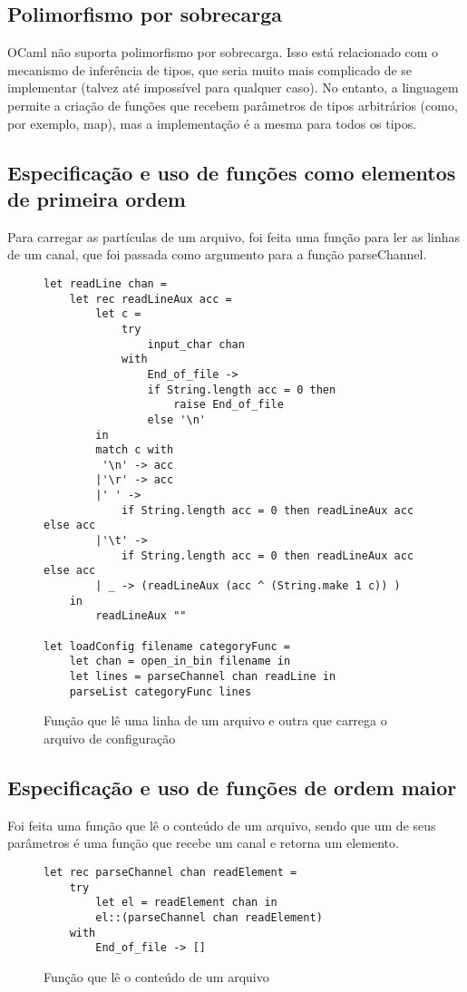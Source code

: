 \documentclass[a4paper,10pt]{article}
\begin{document}
\subsection{Polimorfismo por sobrecarga}
	
	OCaml não suporta polimorfismo por sobrecarga. Isso está relacionado com o mecanismo de inferência de tipos, que seria muito mais complicado de se implementar (talvez até impossível para qualquer caso). No entanto, a linguagem permite a criação de funções que recebem parâmetros de tipos arbitrários (como, por exemplo, map), mas a implementação é a mesma para todos os tipos.

\subsection{Especificação e uso de funções como elementos de primeira ordem}
	
	Para carregar as partículas de um arquivo, foi feita uma função para ler as linhas de um canal, que foi passada como argumento para a função parseChannel.
	
	\begin{figure}[H]
	\centering	
	\begin{lstlisting}
let readLine chan =
	let rec readLineAux acc =
		let c =
			try
				input_char chan
			with
				End_of_file ->
				if String.length acc = 0 then
					raise End_of_file
				else '\n'
		in
		match c with
		 '\n' -> acc
		|'\r' -> acc
		|' ' ->
			if String.length acc = 0 then readLineAux acc else acc
		|'\t' ->
			if String.length acc = 0 then readLineAux acc else acc
		| _ -> (readLineAux (acc ^ (String.make 1 c)) )
	in
		readLineAux ""
		
let loadConfig filename categoryFunc =
	let chan = open_in_bin filename in
	let lines = parseChannel chan readLine in
	parseList categoryFunc lines
	\end{lstlisting}
	\caption{Função que lê uma linha de um arquivo e outra que carrega o arquivo de configuração}
\end{figure}
	
\subsection{Especificação e uso de funções de ordem maior}

Foi feita uma função que lê o conteúdo de um arquivo, sendo que um de seus parâmetros é uma função que recebe um canal e retorna um elemento.

\begin{figure}[H]
	\centering	
	\begin{lstlisting}
let rec parseChannel chan readElement =
	try
		let el = readElement chan in
		el::(parseChannel chan readElement)
	with
		End_of_file -> []
	\end{lstlisting}
	\caption{Função que lê o conteúdo de um arquivo}
\end{figure}
	
\end{document}
